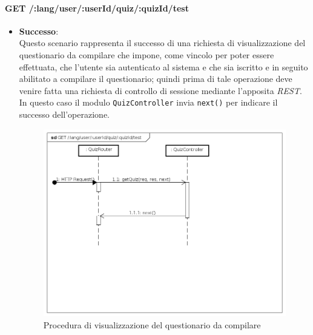 \paragraph{GET /:lang/user/:userId/quiz/:quizId/test} %
\begin{itemize}
\item \textbf{Successo}:\\
Questo scenario rappresenta il successo di una richiesta di visualizzazione del questionario da compilare che impone, come vincolo per poter essere effettuata, che l'utente sia autenticato al sistema e che sia iscritto e in seguito abilitato a compilare il questionario; quindi prima di tale operazione deve venire fatta una richiesta di controllo di sessione mediante l'apposita \textit{REST}. In questo caso il modulo \texttt{QuizController} invia \texttt{next()} per indicare il successo dell'operazione.
\label{Procedura di visualizzazione del questionario da compilare}
\begin{figure}[ht]
	\centering
	\includegraphics[scale=0.40]{UML/DiagrammiDiSequenza/Back-end/GET__lang_user_userId_quiz_quizId_test_success.png}
	\caption{Procedura di visualizzazione del questionario da compilare}
\end{figure}
\FloatBarrier


\end{itemize}

